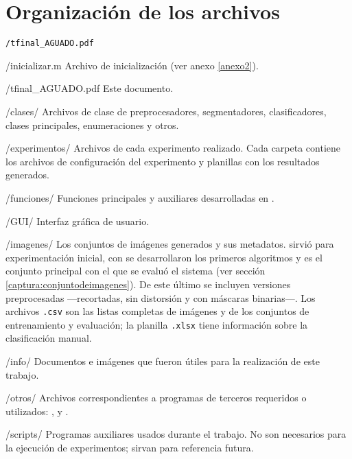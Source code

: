 \chapter{Organización de los archivos}\label{anexo1}

\begin{labeling}[—]{\texttt{/tfinal\_AGUADO.pdf}}
\item [/inicializar.m] Archivo de inicialización (ver anexo \ref{anexo2}).
\item [/tfinal\_AGUADO.pdf] Este documento.
\item [/clases/] Archivos de clase de preprocesadores, segmentadores, clasificadores, clases principales, enumeraciones y otros.
\item [/experimentos/] Archivos de cada experimento realizado. Cada carpeta contiene los archivos de configuración del experimento y planillas con los resultados generados.
\item [/funciones/] Funciones principales y auxiliares desarrolladas en .
\item [/GUI/] Interfaz gráfica de usuario.
\item [/imagenes/] Los conjuntos de imágenes generados y sus metadatos.  sirvió para experimentación inicial, con  se desarrollaron los primeros algoritmos y  es el conjunto principal con el que se evaluó el sistema (ver sección \ref{captura:conjuntodeimagenes}). De este último se incluyen versiones preprocesadas ---recortadas, sin distorsión y con máscaras binarias---. Los archivos \texttt{.csv} son las listas completas de imágenes y de los conjuntos de entrenamiento y evaluación; la planilla \texttt{.xlsx} tiene información sobre la clasificación manual.
\item [/info/] Documentos e imágenes que fueron útiles para la realización de este trabajo.
\item [/otros/] Archivos correspondientes a programas de terceros requeridos o utilizados: ,  y .
\item [/scripts/] Programas auxiliares usados durante el trabajo. No son necesarios para la ejecución de experimentos; sirvan para referencia futura.
\end{labeling}